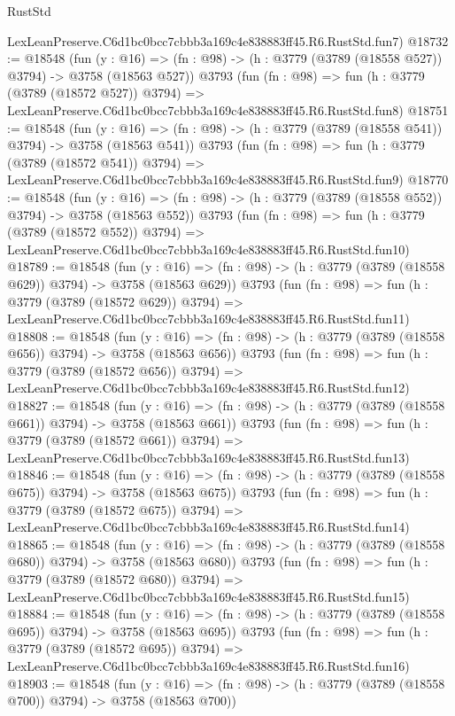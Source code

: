 \begin{lexlean}{RustStd}
\begin{coremodule}
    LexLeanPreserve.C6d1bc0bcc7cbbb3a169c4e838883ff45.R6.RustStd.fun7)
@18732 := @18548
    (fun (y : @16) => (fn : @98) -> (h : @3779 (@3789 (@18558 @527)) @3794) -> @3758 (@18563 @527))
    @3793
    (fun (fn : @98) =>
    fun (h : @3779 (@3789 (@18572 @527)) @3794) =>
    LexLeanPreserve.C6d1bc0bcc7cbbb3a169c4e838883ff45.R6.RustStd.fun8)
@18751 := @18548
    (fun (y : @16) => (fn : @98) -> (h : @3779 (@3789 (@18558 @541)) @3794) -> @3758 (@18563 @541))
    @3793
    (fun (fn : @98) =>
    fun (h : @3779 (@3789 (@18572 @541)) @3794) =>
    LexLeanPreserve.C6d1bc0bcc7cbbb3a169c4e838883ff45.R6.RustStd.fun9)
@18770 := @18548
    (fun (y : @16) => (fn : @98) -> (h : @3779 (@3789 (@18558 @552)) @3794) -> @3758 (@18563 @552))
    @3793
    (fun (fn : @98) =>
    fun (h : @3779 (@3789 (@18572 @552)) @3794) =>
    LexLeanPreserve.C6d1bc0bcc7cbbb3a169c4e838883ff45.R6.RustStd.fun10)
@18789 := @18548
    (fun (y : @16) => (fn : @98) -> (h : @3779 (@3789 (@18558 @629)) @3794) -> @3758 (@18563 @629))
    @3793
    (fun (fn : @98) =>
    fun (h : @3779 (@3789 (@18572 @629)) @3794) =>
    LexLeanPreserve.C6d1bc0bcc7cbbb3a169c4e838883ff45.R6.RustStd.fun11)
@18808 := @18548
    (fun (y : @16) => (fn : @98) -> (h : @3779 (@3789 (@18558 @656)) @3794) -> @3758 (@18563 @656))
    @3793
    (fun (fn : @98) =>
    fun (h : @3779 (@3789 (@18572 @656)) @3794) =>
    LexLeanPreserve.C6d1bc0bcc7cbbb3a169c4e838883ff45.R6.RustStd.fun12)
@18827 := @18548
    (fun (y : @16) => (fn : @98) -> (h : @3779 (@3789 (@18558 @661)) @3794) -> @3758 (@18563 @661))
    @3793
    (fun (fn : @98) =>
    fun (h : @3779 (@3789 (@18572 @661)) @3794) =>
    LexLeanPreserve.C6d1bc0bcc7cbbb3a169c4e838883ff45.R6.RustStd.fun13)
@18846 := @18548
    (fun (y : @16) => (fn : @98) -> (h : @3779 (@3789 (@18558 @675)) @3794) -> @3758 (@18563 @675))
    @3793
    (fun (fn : @98) =>
    fun (h : @3779 (@3789 (@18572 @675)) @3794) =>
    LexLeanPreserve.C6d1bc0bcc7cbbb3a169c4e838883ff45.R6.RustStd.fun14)
@18865 := @18548
    (fun (y : @16) => (fn : @98) -> (h : @3779 (@3789 (@18558 @680)) @3794) -> @3758 (@18563 @680))
    @3793
    (fun (fn : @98) =>
    fun (h : @3779 (@3789 (@18572 @680)) @3794) =>
    LexLeanPreserve.C6d1bc0bcc7cbbb3a169c4e838883ff45.R6.RustStd.fun15)
@18884 := @18548
    (fun (y : @16) => (fn : @98) -> (h : @3779 (@3789 (@18558 @695)) @3794) -> @3758 (@18563 @695))
    @3793
    (fun (fn : @98) =>
    fun (h : @3779 (@3789 (@18572 @695)) @3794) =>
    LexLeanPreserve.C6d1bc0bcc7cbbb3a169c4e838883ff45.R6.RustStd.fun16)
@18903 := @18548
    (fun (y : @16) => (fn : @98) -> (h : @3779 (@3789 (@18558 @700)) @3794) -> @3758 (@18563 @700))

\end{coremodule}
\end{lexlean}

